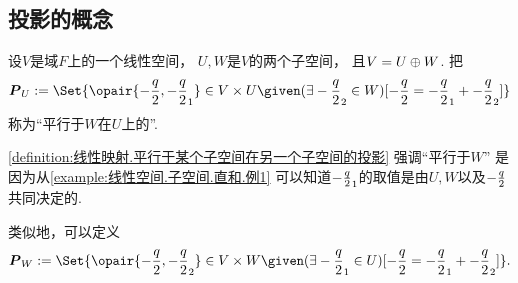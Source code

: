 \subsection{投影的概念}
\begin{definition}\label{definition:线性映射.平行于某个子空间在另一个子空间的投影}
设\(V\)是域\(F\)上的一个线性空间，
\(U,W\)是\(V\)的两个子空间，
且\(V=U \oplus W\).
把\[
	\vb{P}_U
	\defeq
	\Set{
		\opair{\a,\a_1}
		\in
		V \times U
		\given
		(\exists \a_2 \in W)
		[\a=\a_1+\a_2]
	}
\]
称为“平行于\(W\)在\(U\)上的”.
\end{definition}
\begin{remark}
\cref{definition:线性映射.平行于某个子空间在另一个子空间的投影}
强调“平行于\(W\)”
是因为从\cref{example:线性空间.子空间.直和.例1}
可以知道\(-\frac{q}{2}_1\)的取值是由\(U,W\)以及\(-\frac{q}{2}\)共同决定的.
\end{remark}
\begin{remark}
类似地，可以定义\[
	\vb{P}_W
	\defeq
	\Set{
		\opair{\a,\a_2}
		\in
		V \times W
		\given
		(\exists \a_1 \in U)
		[\a=\a_1+\a_2]
	}.
\]
\end{remark}

